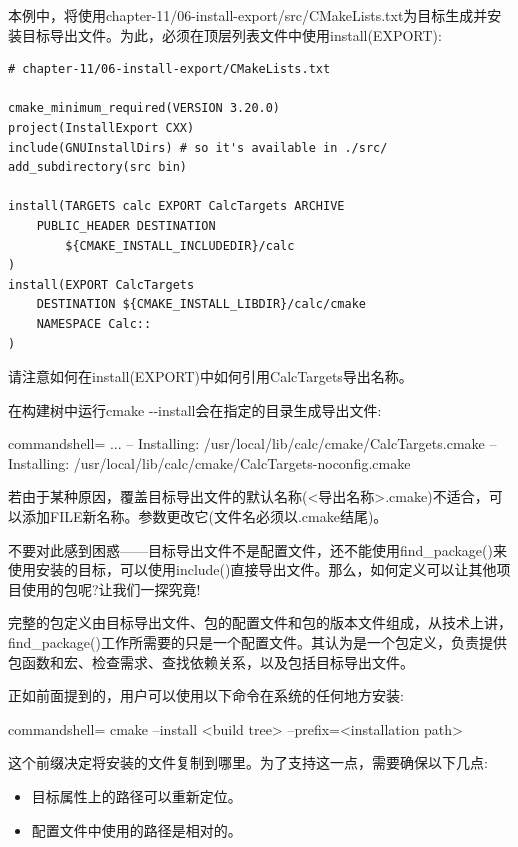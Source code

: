 本例中，将使用chapter-11/06-install-export/src/CMakeLists.txt为目标生成并安装目标导出文件。为此，必须在顶层列表文件中使用install(EXPORT):

\begin{lstlisting}[style=styleCMake]
# chapter-11/06-install-export/CMakeLists.txt

cmake_minimum_required(VERSION 3.20.0)
project(InstallExport CXX)
include(GNUInstallDirs) # so it's available in ./src/
add_subdirectory(src bin)

install(TARGETS calc EXPORT CalcTargets ARCHIVE
	PUBLIC_HEADER DESTINATION
		${CMAKE_INSTALL_INCLUDEDIR}/calc
)
install(EXPORT CalcTargets
	DESTINATION ${CMAKE_INSTALL_LIBDIR}/calc/cmake
	NAMESPACE Calc::
)
\end{lstlisting}

请注意如何在install(EXPORT)中如何引用CalcTargets导出名称。

在构建树中运行cmake -{}-install会在指定的目录生成导出文件:

\begin{tcblisting}{commandshell={}}
...
-- Installing: /usr/local/lib/calc/cmake/CalcTargets.cmake
-- Installing: /usr/local/lib/calc/cmake/CalcTargets-noconfig.cmake
\end{tcblisting}

若由于某种原因，覆盖目标导出文件的默认名称(<导出名称>.cmake)不适合，可以添加FILE新名称。参数更改它(文件名必须以.cmake结尾)。

不要对此感到困惑——目标导出文件不是配置文件，还不能使用find\_package()来使用安装的目标，可以使用include()直接导出文件。那么，如何定义可以让其他项目使用的包呢?让我们一探究竟!


完整的包定义由目标导出文件、包的配置文件和包的版本文件组成，从技术上讲，find\_package()工作所需要的只是一个配置文件。其认为是一个包定义，负责提供包函数和宏、检查需求、查找依赖关系，以及包括目标导出文件。

正如前面提到的，用户可以使用以下命令在系统的任何地方安装:

\begin{tcblisting}{commandshell={}}
cmake --install <build tree> --prefix=<installation path>
\end{tcblisting}

这个前缀决定将安装的文件复制到哪里。为了支持这一点，需要确保以下几点:

\begin{itemize}
\item 
目标属性上的路径可以重新定位。

\item 
配置文件中使用的路径是相对的。
\end{itemize}

